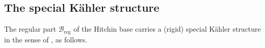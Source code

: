 \documentclass[12pt,letterpaper,reqno]{article}
\numberwithin{equation}{section}
\newcommand{\cB}{\ensuremath{\mathcal B}}
\newcommand{\cM}{\ensuremath{\mathcal M}}
\newcommand{\kahler}{K\"ahler\xspace}
\newcommand{\hk}{hyperk\"ahler\xspace}
\newcommand{\reg}{\mathrm{reg}}
\DeclareMathOperator{\Tr}{Tr}
\newcommand{\fixme}[1]{{\color{orange}{[#1]}}}
\begin{document}








\subsection{The special \kahler structure}

The regular part $\cB_\reg$ of the Hitchin base 
carries a (rigid) special \kahler structure 
in the sense of \cite{Freed:1997dp}, as follows.
\end{document}
